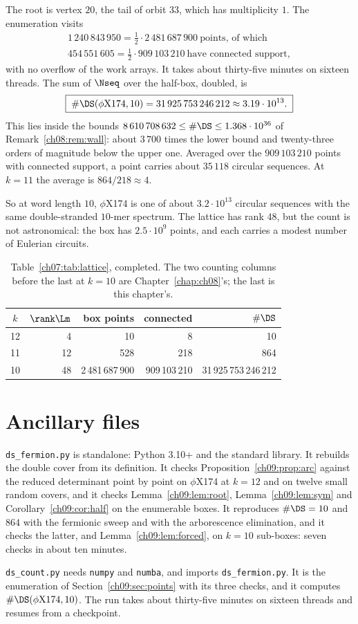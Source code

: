 The root is vertex $20$, the tail of orbit $33$, which has multiplicity $1$. The enumeration
visits
\begin{gather*}
1\,240\,843\,950=\tfrac12\cdot 2\,481\,687\,900 \ \text{points, of which}\\
454\,551\,605=\tfrac12\cdot 909\,103\,210\ \text{have connected support},
\end{gather*}
with no overflow of the work arrays. It takes about thirty-five minutes on sixteen threads.
The sum of $\Nseq$ over the half-box, doubled, is
\[
\boxed{\;\#\DS(\phi\mathrm{X}174,10)=31\,925\,753\,246\,212\approx3.19\cdot10^{13}.\;}
\]
This lies inside the bounds $8\,610\,708\,632\le\#\DS\le1.368\cdot10^{36}$ of
Remark~\ref{ch08:rem:wall}: about $3\,700$
times the lower bound and twenty-three orders of magnitude below the upper one. Averaged over
the $909\,103\,210$ points with connected support, a point carries about $35\,118$ circular
sequences. At $k=11$ the average is $864/218\approx4$.

So at word length $10$, $\phi$X174 is one of about $3.2\cdot10^{13}$ circular sequences with
the same double-stranded $10$-mer spectrum. The lattice has rank $48$, but the count is not
astronomical: the box has $2.5\cdot10^9$ points, and each carries a modest number of Eulerian
circuits.

\begin{table}[t]
\centering
\begin{tabular}{crrrr}
\toprule
$k$ & $\rank\Lm$ & box points & connected & $\#\DS$ \\
\midrule
12 & 4  & 10 & 8 & 10 \\
11 & 12 & 528 & 218 & 864 \\
10 & 48 & 2\,481\,687\,900 & 909\,103\,210 & 31\,925\,753\,246\,212 \\
\bottomrule
\end{tabular}
\caption{Table~\ref{ch07:tab:lattice}, completed. The two counting columns before the last at
$k=10$ are Chapter~\ref{chap:ch08}'s; the last is this chapter's.}\label{ch09:tab:done}
\end{table}

\section*{Ancillary files}
\texttt{ds\_fermion.py} is standalone: Python 3.10+ and the standard library. It rebuilds the
double cover from its definition. It checks Proposition~\ref{ch09:prop:arc} against the reduced
determinant point by point on $\phi$X174 at $k=12$ and on twelve small random covers, and it
checks Lemma~\ref{ch09:lem:root}, Lemma~\ref{ch09:lem:sym} and Corollary~\ref{ch09:cor:half} on the enumerable
boxes. It reproduces $\#\DS=10$ and $864$ with the fermionic sweep and with the arborescence
elimination, and it checks the latter, and Lemma~\ref{ch09:lem:forced}, on $k=10$ sub-boxes: seven
checks in about ten minutes.

\texttt{ds\_count.py} needs \texttt{numpy} and \texttt{numba}, and imports
\texttt{ds\_fermion.py}. It is the enumeration of Section~\ref{ch09:sec:points} with its three
checks, and it computes $\#\DS(\phi\mathrm{X}174,10)$. The run takes about thirty-five minutes on
sixteen threads and resumes from a checkpoint.
